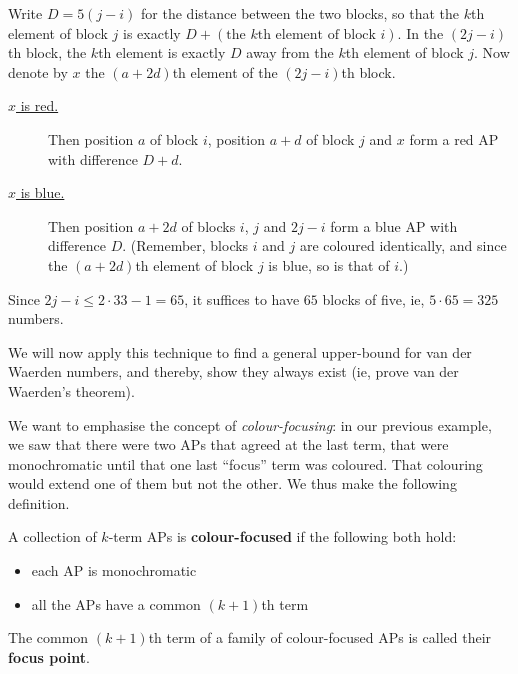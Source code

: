 Write $D = 5(j - i)$ for the distance between the two blocks, so that the $k$th element of block $j$ is exactly $D + (\text{the $k$th element of block $i$})$. In the $(2j - i)$th block, the $k$th element is exactly $D$ away from the $k$th element of block $j$. Now denote by $x$ the $(a + 2d)$th element of the $(2j - i)$th block.
\begin{description}
    \item[\underline{$x$ is red.}] Then position $a$ of block $i$, position $a + d$ of block $j$ and $x$ form a red AP with difference $D + d$.
    \item[\underline{$x$ is blue.}] Then position $a + 2d$ of blocks $i$, $j$ and $2j - i$ form a blue AP with difference $D$. (Remember, blocks $i$ and $j$ are coloured identically, and since the $(a + 2d)$th element of block $j$ is blue, so is that of $i$.)
\end{description}
Since $2j - i \leq 2 \cdot 33 - 1 = 65$, it suffices to have $65$ blocks of five, ie, $5 \cdot 65 = 325$ numbers.

We will now apply this technique to find a general upper-bound for van der Waerden numbers, and thereby, show they always exist (ie, prove van der Waerden's theorem).

We want to emphasise the concept of \textit{colour-focusing}: in our previous example, we saw that there were two APs that agreed at the last term, that were monochromatic until that one last ``focus'' term was coloured. That colouring would extend one of them but not the other. We thus make the following definition.

\begin{boxdefinition}
    A collection of $k$-term APs is \textbf{colour-focused} if the following both hold:
    \begin{itemize}
        \item each AP is monochromatic
        \item all the APs have a common $(k + 1)$th term
    \end{itemize}
    The common $(k + 1)$th term of a family of colour-focused APs is called their \textbf{focus point}.
\end{boxdefinition}

